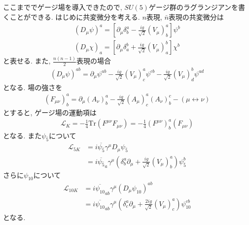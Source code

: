 ここまででゲージ場を導入できたので, $SU(5)$ゲージ群のラグランジアンを書くことができる.
はじめに共変微分を考える.
$n$表現, $\bar{n}$表現の共変微分は
\begin{align}
  (D_\mu \psi)^a = \left[\partial_\mu \delta^a_b - \frac{ig}{\sqrt{2}}(V_\mu)^a_b\right]\psi^b\nonumber\\
  (D_\mu \chi)_a = \left[\partial_\mu \delta^b_a + \frac{ig}{\sqrt{2}}(V_\mu)^b_a\right]\chi^b\nonumber
\end{align}
と表せる.
また, $\frac{n(n-1)}{2}$表現の場合
\begin{align}
  (D_\mu \psi)^{ab} = \partial_\mu \psi^{ab} - \frac{ig}{\sqrt{2}}(V_\mu)^a_c\psi^{cb}- \frac{ig}{\sqrt{2}}(V_\mu)^b_d\psi^{ad}\nonumber
\end{align}
となる.
場の強さを
\begin{align}
  (F_{\mu\nu})^a_b = \partial_\mu(A_\nu)^a_b -\frac{ig}{\sqrt{2}}(A_\mu)^a_c (A_\nu)^c_b - (\mu\leftrightarrow\nu)
\end{align}
とすると, ゲージ場の運動項は
\begin{align}
  \mathcal{L}_K = -\frac{1}{4}\mathrm{Tr}(F^{\mu\nu}F_{\mu\nu})=-\frac{1}{4}(F^{\mu\nu})^a_b(F_{\mu\nu})
\end{align}
となる.
また$\psi_{\bar{5}}$について
\begin{align}
  \mathcal{L}_{5K} &= i\overline{\psi_{\bar{5}}}\gamma^\mu D_\mu\psi_{\bar{5}}\nonumber\\
                   &= i\overline{\psi_{\bar{5}}}_a\gamma^\mu \left(\delta^a_b \partial_\mu + \frac{ig}{\sqrt{2}}(V_\mu)^a_b\right)\psi_{\bar{5}}^b\nonumber
\end{align}
さらに$\psi_{10}$について
\begin{align}
  \mathcal{L}_{10K} &= i\overline{\psi_{10}}_{ab}\gamma^\mu \left(D_\mu\psi_{10}\right)^{ab}\nonumber\\
                    &= i\overline{\psi_{10}}_{ab}\gamma^\mu \left(\delta^a_c \partial_\mu + \frac{2ig}{\sqrt{2}}(V_\mu)^a_c\right)\psi_{10}^{cb}\nonumber
\end{align}
となる.

